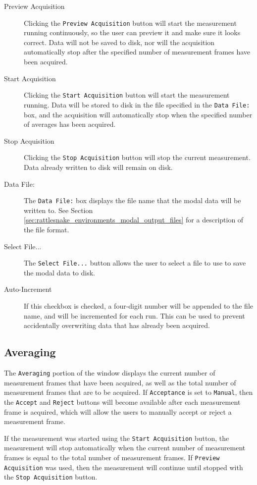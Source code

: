\documentclass[pdf,12pt,report]{SANDreport}
\newcommand{\inlineCode}{\lstinline[basicstyle=\bfseries\ttfamily]}
\begin{document}
    \begin{description}
        \item[Preview Acquisition] Clicking the \inlineCode{Preview Acquisition} button will start the measurement running continuously, so the user can preview it and make sure it looks correct.  Data will not be saved to disk, nor will the acquisition automatically stop after the specified number of measurement frames have been acquired.
        \item[Start Acquisition]  Clicking the \inlineCode{Start Acquisition} button will start the measurement running.  Data will be stored to disk in the file specified in the \inlineCode{Data File:} box, and the acquisition will automatically stop when the specified number of averages has been acquired.
        \item[Stop Acquisition] Clicking the \inlineCode{Stop Acquisition} button will stop the current measurement.  Data already written to disk will remain on disk.
        \item[Data File:] The \inlineCode{Data File:} box displays the file name that the modal data will be written to.  See Section \ref{sec:rattlesnake_environments_modal_output_files} for a description of the file format.
        \item[Select File...] The \inlineCode{Select File...} button allows the user to select a file to use to save the modal data to disk.
        \item[Auto-Increment] If this checkbox is checked, a four-digit number will be appended to the file name, and will be incremented for each run.  This can be used to prevent accidentally overwriting data that has already been acquired.
    \end{description}
    
    \subsection{Averaging}
    The \inlineCode{Averaging} portion of the window displays the current number of measurement frames that have been acquired, as well as the total number of measurement frames that are to be acquired.  If \inlineCode{Acceptance} is set to \inlineCode{Manual}, then the \inlineCode{Accept} and \inlineCode{Reject} buttons will become available after each measurement frame is acquired, which will allow the users to manually accept or reject a measurement frame.
    
    If the measurement was started using the \inlineCode{Start Acquisition} button, the measurement will stop automatically when the current number of measurement frames is equal to the total number of measurement frames.  If \inlineCode{Preview Acquisition} was used, then the measurement will continue until stopped with the \inlineCode{Stop Acquisition} button.
    
\end{document}
